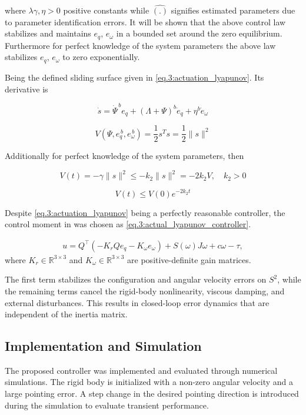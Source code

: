 where $\lambda \gamma, \eta > 0$ positive constants while $\hat{(.)}$ signifies estimated parameters due to parameter identification errors. It will be shown that the above control law stabilizes and maintains $e_q$, $e_\omega$ in a bounded set around the zero equilibrium. Furthermore for perfect knowledge of the system parameters the above law stabilizes $e_q$, $e_\omega$ to zero exponentially.

Being the defined sliding surface given in \ref{eq.3:actuation_lyapunov}. Its derivative is 

\[
\dot{s} = \dot{\Psi}^{\,b} e_q + (\Lambda + \Psi)^{b} \dot{e}_q + \eta^{b} \dot{e}_\omega
\]


\[
V(\Psi, e_q^{\,b}, e_\omega^{\,b}) = \frac{1}{2} s^{T} s = \frac{1}{2} \lVert s \rVert^{2}
\]

Additionally for perfect knowledge of the system parameters, then

\[
V(t) = -\gamma \| s \|^2 \leq -k_2 \| s \|^2 = -2 k_2 V, \quad k_2 > 0
\]

\[
V(t) \leq V(0) e^{-2 k_2 t}
\]

Despite \ref{eq.3:actuation_lyapunov} being a perfectly reasonable controller, the control moment in \cite{lyapunov_outer_loop_control} was chosen as \ref{eq.3:actual_lyapunov_controller}.

\begin{align}
u =
Q^\top\left(
- K_r Q e_q
- K_\omega e_\omega
\right)
+ S(\omega) J \omega
+ c \omega
- \tau,
\label{eq.3:actual_lyapunov_controller}
\end{align}
where \( K_r \in \mathbb{R}^{3\times3} \) and \( K_\omega \in \mathbb{R}^{3\times3} \) are positive-definite gain matrices.

The first term stabilizes the configuration and angular velocity errors on \( S^2 \), while the remaining terms cancel the rigid-body nonlinearity, viscous damping, and external disturbances. This results in closed-loop error dynamics that are independent of the inertia matrix.

\subsection{Implementation and Simulation}

The proposed controller was implemented and evaluated through numerical simulations. The rigid body is initialized with a non-zero angular velocity and a large pointing error. A step change in the desired pointing direction is introduced during the simulation to evaluate transient performance.


